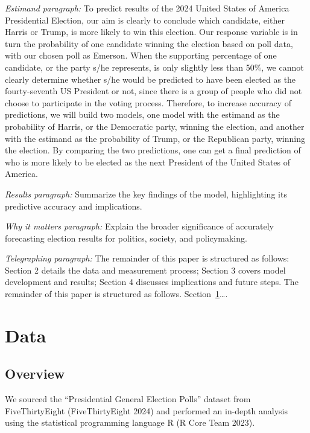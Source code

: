 \documentclass[
  letterpaper,
  DIV=11,
  numbers=noendperiod]{scrartcl}
\begin{document}
\emph{Estimand paragraph:} To predict results of the 2024 United States
of America Presidential Election, our aim is clearly to conclude which
candidate, either Harris or Trump, is more likely to win this election.
Our response variable is in turn the probability of one candidate
winning the election based on poll data, with our chosen poll as
Emerson. When the supporting percentage of one candidate, or the party
s/he represents, is only slightly less than 50\%, we cannot clearly
determine whether s/he would be predicted to have been elected as the
fourty-seventh US President or not, since there is a group of people who
did not choose to participate in the voting process. Therefore, to
increase accuracy of predictions, we will build two models, one model
with the estimand as the probability of Harris, or the Democratic party,
winning the election, and another with the estimand as the probability
of Trump, or the Republican party, winning the election. By comparing
the two predictions, one can get a final prediction of who is more
likely to be elected as the next President of the United States of
America.

\emph{Results paragraph:} Summarize the key findings of the model,
highlighting its predictive accuracy and implications.

\emph{Why it matters paragraph:} Explain the broader significance of
accurately forecasting election results for politics, society, and
policymaking.

\emph{Telegraphing paragraph:} The remainder of this paper is structured
as follows: Section 2 details the data and measurement process; Section
3 covers model development and results; Section 4 discusses implications
and future steps. The remainder of this paper is structured as follows.
Section~\ref{sec-data}\ldots.

\section{Data}\label{sec-data}

\subsection{Overview}\label{overview}

We sourced the ``Presidential General Election Polls'' dataset from
FiveThirtyEight (FiveThirtyEight 2024) and performed an in-depth
analysis using the statistical programming language R (R Core Team
2023).
\end{document}
